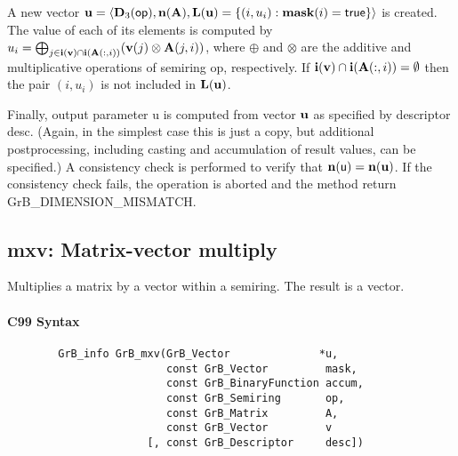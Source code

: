 A new vector ${\bf u} = \langle \bold{D}_3({\sf op}),
\bold{n}({\bf A}), \bold{L}({\bf u}) = \{(i,u_i) : {\bf mask}(i)
= {\sf true} \} \rangle$ is created.  The value of each of its elements
is computed by $u_i = \bigoplus_{j \in {\bf i}({\bf v}) \cap
{\bf i}({\bf A}(:,i))} ({\bf v}(j) \otimes {\bf A}(j,i))$,
where $\oplus$ and $\otimes$ are the additive and multiplicative
operations of semiring {\sf op}, respectively.  If ${\bf i}({\bf v})
\cap {\bf i}({\bf A}(:,i)) = \emptyset$ then the pair $(i,u_i)$
is not included in $\bold{L}({\bf u})$.

Finally, output parameter {\sf u} is computed from vector ${\bf u}$
as specified by descriptor {\sf desc}. (Again, in the simplest case this
is just a copy, but additional postprocessing, including casting and
accumulation of result values, can be specified.)  A consistency check is
performed to verify that $\bold{n}({\sf u}) = \bold{n}({\bf u})$. If
the consistency check fails, the operation is aborted and the method
return {\sf GrB\_DIMENSION\_MISMATCH}.

 


\subsection{{\sf mxv}: Matrix-vector multiply}

Multiplies a matrix by a vector within a semiring. The result is a vector.

\paragraph{C99 Syntax}

\begin{verbatim}
        GrB_info GrB_mxv(GrB_Vector              *u,
                         const GrB_Vector         mask,
                         const GrB_BinaryFunction accum,
                         const GrB_Semiring       op, 
                         const GrB_Matrix         A,
                         const GrB_Vector         v
                      [, const GrB_Descriptor     desc])
\end{verbatim}


